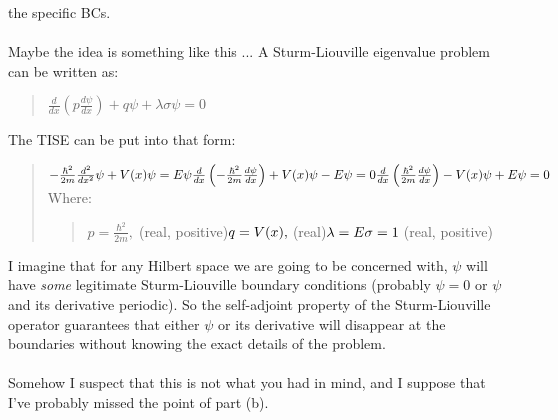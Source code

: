 \documentclass{article}
\begin{document}
    the specific BCs.
\\\\
    Maybe the idea is something like this ... A Sturm-Liouville
    eigenvalue problem can be written as:
    \begin{quote}
    $
    \frac{d}{dx} \left(p\frac{d\psi}{dx}\right) +q\psi+ \lambda \sigma\psi=0
    $
    \end{quote}
    The TISE can be put into that form:
    \begin{quote}
    $
    -\frac{\hbar^2}{2m}\frac{d^2}{dx^2}\psi + V(x)\psi = E\psi
    \vspace{12pt}\\
    \frac{d}{dx} \left(-\frac{\hbar^2}{2m}\frac{d\psi}{dx}\right)
        +V(x)\psi -E \psi=0
    \vspace{12pt}\\
    \frac{d}{dx} \left(\frac{\hbar^2}{2m}\frac{d\psi}{dx}\right)
        -V(x)\psi+ E \psi=0
    $
    \vspace{12pt}\\
    Where:
        \begin{quote}
        $
        p = \frac{\hbar^2}{2m},\; $(real, positive)$
        \vspace{6pt}\\
        q = V(x),\; $(real)$
        \vspace{6pt}\\
        \lambda = E
        \vspace{6pt}\\
        \sigma = 1\; $(real, positive)$
        $
        \end{quote}
    \end{quote}
I imagine that for any Hilbert space we are going to be concerned with, 
$\psi$ will have {\it some}
legitimate Sturm-Liouville boundary conditions (probably $\psi=0$
or $\psi$ and its derivative periodic).
So the self-adjoint property of the Sturm-Liouville operator guarantees that
either $\psi$ or its derivative will disappear at the boundaries without
knowing the exact details of the problem.
\\\\
Somehow I suspect that this is not what you had in mind, and I suppose
that I've probably missed the point of part (b).
\end{document}
